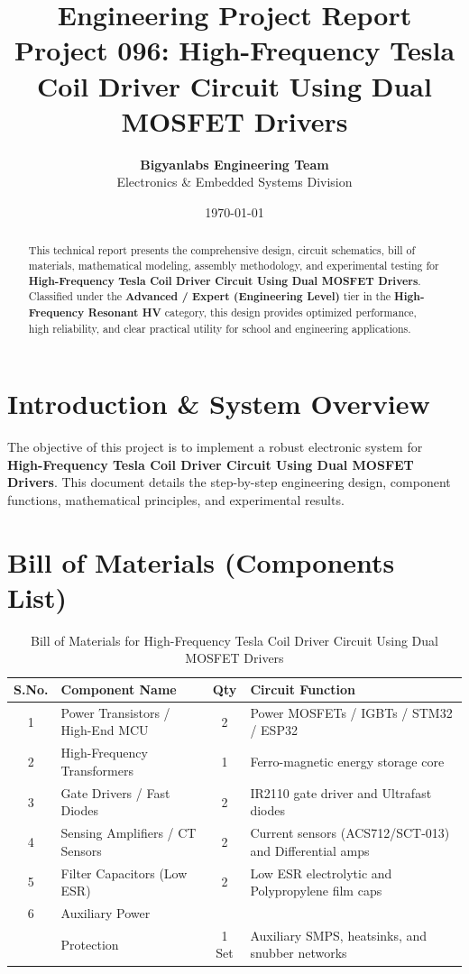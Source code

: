\documentclass[11pt,a4paper]{article}
\title{\textbf{\Huge Engineering Project Report}\\[0.5em] \Large Project 096: High-Frequency Tesla Coil Driver Circuit Using Dual MOSFET Drivers}
\author{\textbf{Bigyanlabs Engineering Team}\\ Electronics \& Embedded Systems Division}
\date{\today}
\begin{document}
\maketitle
\thispagestyle{empty}

\begin{abstract}
This technical report presents the comprehensive design, circuit schematics, bill of materials, mathematical modeling, assembly methodology, and experimental testing for \textbf{High-Frequency Tesla Coil Driver Circuit Using Dual MOSFET Drivers}. Classified under the \textbf{Advanced / Expert (Engineering Level)} tier in the \textbf{High-Frequency Resonant HV} category, this design provides optimized performance, high reliability, and clear practical utility for school and engineering applications.
\end{abstract}

\newpage
\tableofcontents
\newpage

\section{Introduction \& System Overview}
The objective of this project is to implement a robust electronic system for \textbf{High-Frequency Tesla Coil Driver Circuit Using Dual MOSFET Drivers}. This document details the step-by-step engineering design, component functions, mathematical principles, and experimental results.

\section{Bill of Materials (Components List)}
\begin{table}[h!]
\centering
\caption{Bill of Materials for High-Frequency Tesla Coil Driver Circuit Using Dual MOSFET Drivers}
\vspace{0.5em}
\begin{tabular}{clcp{7cm}}
\toprule
\textbf{S.No.} & \textbf{Component Name} & \textbf{Qty} & \textbf{Circuit Function} \\
\midrule
1 & Power Transistors / High-End MCU & 2 & Power MOSFETs / IGBTs / STM32 / ESP32 \\
2 & High-Frequency Transformers & 1 & Ferro-magnetic energy storage core \\
3 & Gate Drivers / Fast Diodes & 2 & IR2110 gate driver and Ultrafast diodes \\
4 & Sensing Amplifiers / CT Sensors & 2 & Current sensors (ACS712/SCT-013) and Differential amps \\
5 & Filter Capacitors (Low ESR) & 2 & Low ESR electrolytic and Polypropylene film caps \\
6 & Auxiliary Power \\& Protection & 1 Set & Auxiliary SMPS, heatsinks, and snubber networks \\
\bottomrule
\end{tabular}
\end{table}
\end{document}
